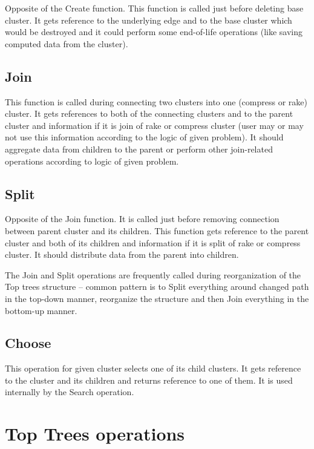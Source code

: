 Opposite of the Create function. This function is called just before deleting
base cluster. It gets reference to the underlying edge and to the base cluster
which would be destroyed and it could perform some end-of-life operations (like
saving computed data from the cluster).

\subsection{Join}

This function is called during connecting two clusters into one (compress or
rake) cluster. It gets references to both of the connecting clusters and to the
parent cluster and information if it is join of rake or compress cluster (user
may or may not use this information according to the logic of given problem). It
should aggregate data from children to the parent or perform other join-related
operations according to logic of given problem.

\subsection{Split}

Opposite of the Join function. It is called just before removing connection
between parent cluster and its children. This function gets reference to the
parent cluster and both of its children and information if it is split of rake
or compress cluster. It should distribute data from the parent into children.

The Join and Split operations are frequently called during reorganization of the
Top trees structure -- common pattern is to Split everything around changed path
in the top-down manner, reorganize the structure and then Join everything in the
bottom-up manner.

\subsection{Choose}

This operation for given cluster selects one of its child clusters. It gets
reference to the cluster and its children and returns reference to one of them.
It is used internally by the {\I Search} operation.



\section{Top Trees operations}

